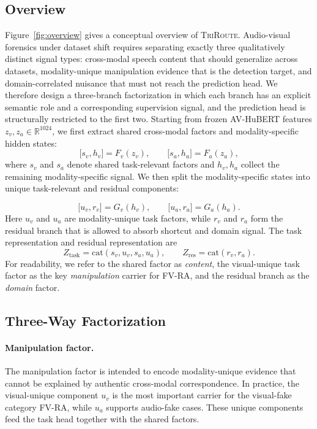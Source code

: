 \documentclass{article}
\newcommand{\method}{\textsc{TriRoute}}
\newcommand{\R}{\mathbb{R}}
\begin{document}
\subsection{Overview}
\vspace{-0.7em}
Figure~\ref{fig:overview} gives a conceptual overview of \method. Audio-visual forensics under dataset shift requires separating exactly three qualitatively distinct signal types: cross-modal speech content that should generalize across datasets, modality-unique manipulation evidence that is the detection target, and domain-correlated nuisance that must not reach the prediction head. We therefore design a three-branch factorization in which each branch has an explicit semantic role and a corresponding supervision signal, and the prediction head is structurally restricted to the first two. Starting from frozen AV-HuBERT features $z_v, z_a \in \R^{1024}$, we first extract shared cross-modal factors and modality-specific hidden states:
\begin{equation}
\big[s_v, h_v\big] = F_v(z_v), \qquad \big[s_a, h_a\big] = F_a(z_a),
\end{equation}
where $s_v$ and $s_a$ denote shared task-relevant factors and $h_v, h_a$ collect the remaining modality-specific signal. We then split the modality-specific states into unique task-relevant and residual components:

\begin{equation}
\big[u_v, r_v\big] = G_v(h_v), \qquad \big[u_a, r_a\big] = G_a(h_a).
\end{equation}
Here $u_v$ and $u_a$ are modality-unique task factors, while $r_v$ and $r_a$ form the residual branch that is allowed to absorb shortcut and domain signal. The task representation and residual representation are
\begin{equation}
Z_{\mathrm{task}} = \mathrm{cat}(s_v, u_v, s_a, u_a), \qquad
Z_{\mathrm{res}} = \mathrm{cat}(r_v, r_a).
\end{equation}
For readability, we refer to the shared factor as \emph{content}, the visual-unique task factor as the key \emph{manipulation} carrier for FV-RA, and the residual branch as the \emph{domain} factor.

\subsection{Three-Way Factorization}
\vspace{-0.7em}
\paragraph{Manipulation factor.}
The manipulation factor is intended to encode modality-unique evidence that cannot be explained by authentic cross-modal correspondence. In practice, the visual-unique component $u_v$ is the most important carrier for the visual-fake category FV-RA, while $u_a$ supports audio-fake cases. These unique components feed the task head together with the shared factors.
\vspace{-0.7em}
\end{document}
